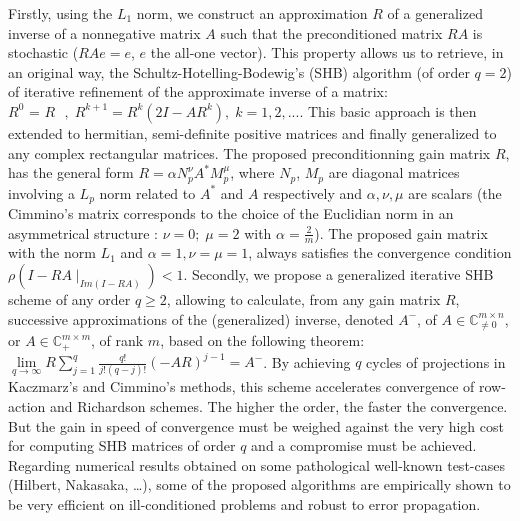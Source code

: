 \documentclass[a4paper]{amsart}
\begin{document}
Firstly, using the $L_1$ norm, we construct an approximation $R$ of a generalized inverse of a nonnegative matrix $A$ such that the preconditioned matrix $RA$ is stochastic ($RAe=e$, $e$ the all-one vector). This property allows us to retrieve, in an original way, the Schultz-Hotelling-Bodewig's (SHB) algorithm (of order $q=2$) of iterative refinement of the approximate inverse of a matrix: $R^0\mbox{ = }R\mbox{ }, \; R^{k+1}=R^k\left({2I-AR^k} \right), \; k = 1,2,...$. This basic approach is then extended to hermitian, semi-definite positive matrices and finally generalized to any complex rectangular matrices. The proposed preconditionning gain matrix $R$, has the general form $R=\alpha N_{p}^{\nu}A^{*}M_{p}^{\mu}$, where $N_{p}$, $M_{p}$ are diagonal matrices involving a $L_p$ norm related to $A^{*}$ and $A$ respectively and $\alpha, \nu, \mu$ are scalars (the Cimmino's matrix corresponds to the choice of the Euclidian norm in an asymmetrical structure : $\nu=0; \; \mu=2$ with $\alpha=\frac{2}{m}$). The proposed gain matrix with the norm $L_1$ and $\alpha=1, \nu=\mu=1$, always satisfies the convergence condition $\rho(I-RA\mid_{Im(I-RA)}) < 1$. Secondly, we propose a generalized iterative SHB scheme of any order $q \geq 2$, allowing to calculate, from any gain matrix $R$, successive approximations of the (generalized) inverse, denoted  $A^-$, of $A \in \mathbb{C}^{m \times n}_{\neq 0}$, or $A \in \mathbb{C}^{m \times m}_{+}$, of rank $m$, based on the following theorem: $\lim \limits_{q\rightarrow\infty} R\sum_{j=1}^{q}\frac{q!}{j!(q-j)!}(-AR)^{j-1} = A^-$. By achieving $q$ cycles of projections in Kaczmarz's and Cimmino's methods, this scheme accelerates convergence of row-action and Richardson schemes. The higher the order, the faster the convergence. But the gain in speed of convergence must be weighed against the very high cost for computing SHB matrices of order $q$ and a compromise must be achieved. Regarding numerical results obtained on some pathological well-known test-cases (Hilbert, Nakasaka, …), some of the proposed algorithms are empirically shown to be very efficient on ill-conditioned problems and robust to error propagation.


 
\end{document}
